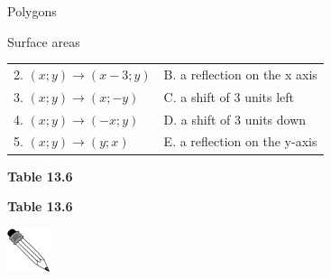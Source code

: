 \begin{exercises}{Polygons}
\begin{exercises}{Surface areas }
\begin{table}[H]
\begin{center}
\begin{xtabular}[t]{|l|l|}
    
        2.
                    $\left(x;y\right)\to \left(x-3;y\right)$
                   &
    
    
        B. a reflection on the x axis%
     \tabularnewline{}
    
    
        3.
                    $\left(x;y\right)\to \left(x;-y\right)$
                   &
    
    
        C. a shift of 3 units left%
     \tabularnewline{}
    
    
        4.
                    $\left(x;y\right)\to \left(-x;y\right)$
                   &
    
    
        D. a shift of 3 units down%
     \tabularnewline{}
    
    
        
5.
                    $\left(x;y\right)\to \left(y;x\right)$
                   &
    
    
        E. a reflection on the y-axis%
     \tabularnewline{}
    \end{xtabular}
      \end{center}
    \begin{center}{\small\bfseries Table 13.6}\end{center}
    \begin{caption}{\small\bfseries Table 13.6}\end{caption}
\end{table}
      
    \par
  
\par
            \label{m39357*secfhsst!!!underscore!!!id147}\vspace{.5cm} 
      
      \noindent
      \hspace*{-30pt}\includegraphics[width=0.5in]{col11306.imgs/pspencil2.png}   
\end{exercises}
\end{exercises}
